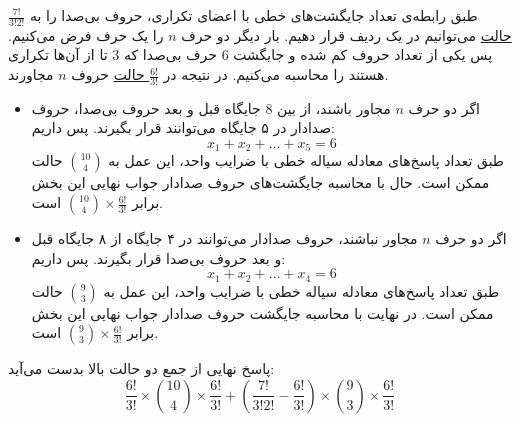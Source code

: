 \p
طبق رابطه‌ی تعداد جایگشت‌های خطی با اعضای تکراری،
حروف بی‌صدا را به 
\underline{$\frac{7!}{3!2!}$ حالت}
 می‌توانیم در یک ردیف قرار دهیم.
 بار ديگر دو حرف
$n$ 
را یک حرف فرض می‌کنیم. پس یکی از تعداد حروف کم شده و جایگشت 6 حرف بی‌‌صدا که 3 تا از آن‌ها تکراری هستند را 
محاسبه می‌کنیم.
در نتیجه در 
\underline{$\frac{6!}{3!}$ حالت} 
 حروف 
$n$ مجاورند.

\begin{itemize}
\item 
اگر دو حرف
 $n$
 مجاور باشند، 
از بین 8 جایگاه قبل و بعد حروف بی‌صدا،
 حروف صدادار در ۵ جایگاه می‌توانند قرار بگیرند.
پس داریم:
$$x_1 + x_2 + \ldots + x_5 = 6$$
طبق تعداد پاسخ‌های معادله سیاله خطی با ضرایب واحد،
اين عمل به 
\underline{$\binom{10}{4}$}
حالت ممكن
است.
حال با محاسبه جایگشت‌های حروف صدادار جواب نهایی این بخش برابر
\underline{$\binom{10}{4}\times\frac{6!}{3!}$}
است.
\item 
اگر دو حرف
 $n$
 مجاور نباشند، حروف صدادار می‌توانند در ۴ جایگاه از ۸ جایگاه  قبل و بعد حروف بی‌صدا قرار بگیرند. پس داریم:
$$x_1 + x_2 + \ldots + x_4 = 6$$
طبق تعداد پاسخ‌های معادله سیاله خطی با ضرایب واحد،
اين عمل به 
\underline{$\binom{9}{3}$}
حالت ممكن
است.
در نهایت با محاسبه جایگشت حروف صدادار جواب نهایی این بخش برابر
\underline{$\binom{9}{3}\times\frac{6!}{3!}$}
است.
\end{itemize}
\p
پاسخ نهایی از جمع دو حالت بالا بدست می‌آید:
$$\frac{6!}{3!}\times\binom{10}{4}\times\frac{6!}{3!}+ (\frac{7!}{3!2!} - \frac{6!}{3!})\times\binom{9}{3}\times\frac{6!}{3!}$$
